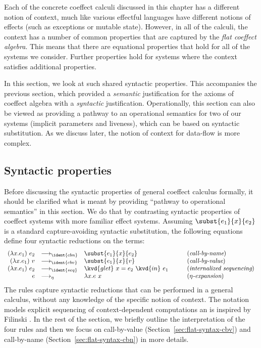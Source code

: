 Each of the concrete coeffect calculi discussed in this chapter has a different notion of context,
much like various effectful languages have different notions of effects (such as exceptions or
mutable state). However, in all of the calculi, the context has a number of common properties that 
are captured by the \emph{flat coeffect algebra}. This means that there are equational properties
that hold for all of the systems we consider. Further properties hold for systems where the context
satisfies additional properties. 

In this section, we look at such shared syntactic properties. This accompanies the previous section, 
which provided a \emph{semantic} justification for the axioms of coeffect algebra with a 
\emph{syntactic} justification. Operationally, this section can also be viewed as providing a 
pathway to an operational semantics for two of our systems (implicit parameters and liveness),
which can be based on syntactic substitution. As we discuss later, the notion of context for
data-flow is more complex.


\subsection{Syntactic properties}
\label{sec:flat-syntax-props}

Before discussing the syntactic properties of general coeffect calculus formally, it should be 
clarified what is meant by providing ``pathway to operational semantics'' in this section. We do
that by contrasting syntactic properties of coeffect systems with more familiar effect systems.
Assuming $\subst{e_1}{x}{e_2}$ is a standard capture-avoiding syntactic substitution, the following
equations define four syntactic reductions on the terms:
%
\begin{equation*}
\begin{array}{rllcl}
(\lambda x.e_1)~e_2 &{\reduce_{\ident{cbn}}}& \subst{e_1}{x}{e_2}   &&(\textit{call-by-name})\\
(\lambda x.e_1)~v   &{\reduce_{\ident{cbv}}}& \subst{e_1}{x}{v}     &\quad&(\textit{call-by-value})\\
(\lambda x.e_1)~e_2 &{\reduce_{\ident{seq}}}& \kvd{glet}~x=e_2~\kvd{in}~e_1  &&(\textit{internalized sequencing})\\
e &{\reduce_\eta}& \lambda x.e~x                                    &&(\textit{$\eta$-expansion})
\end{array}
\end{equation*}
%
The rules capture syntactic reductions that can be performed in a general calculus, without any 
knowledge of the specific notion of context. The  notation models explicit sequencing
of context-dependent computations an is inspired by Filinski \cite{monads-inaction}. In the rest
of the section, we briefly outline the interpretation of the four rules and then we focus on
call-by-value (Section~\ref{sec:flat-syntax-cbv}) and call-by-name (Section~\ref{sec:flat-syntax-cbn})
in more details.

